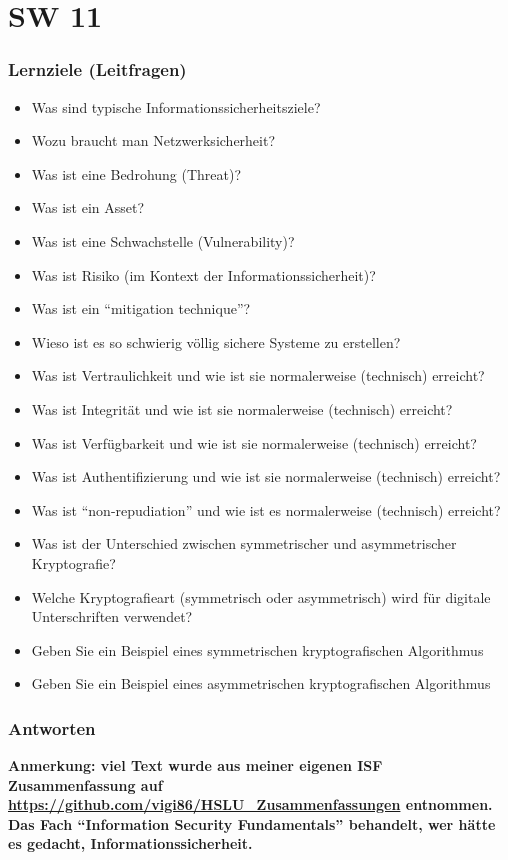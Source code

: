 \part{SW 11}
\section{Lernziele (Leitfragen)}
\begin{itemize}
    \item Was sind typische Informationssicherheitsziele?
    \item Wozu braucht man Netzwerksicherheit?
    \item Was ist eine Bedrohung (Threat)?
    \item Was ist ein Asset?
    \item Was ist eine Schwachstelle (Vulnerability)?
    \item Was ist Risiko (im Kontext der Informationssicherheit)?
    \item Was ist ein "`mitigation technique"'?
    \item Wieso ist es so schwierig völlig sichere Systeme zu erstellen?
    \item Was ist Vertraulichkeit und wie ist sie normalerweise (technisch) erreicht?
    \item Was ist Integrität und wie ist sie normalerweise (technisch) erreicht?
    \item Was ist Verfügbarkeit und wie ist sie normalerweise (technisch) erreicht?
    \item Was ist Authentifizierung und wie ist sie normalerweise (technisch) erreicht?
    \item Was ist "`non-repudiation"' und wie ist es normalerweise (technisch) erreicht?
    \item Was ist der Unterschied zwischen symmetrischer und asymmetrischer Kryptografie?
    \item Welche Kryptografieart (symmetrisch oder asymmetrisch) wird für digitale Unterschriften verwendet?
    \item Geben Sie ein Beispiel eines symmetrischen kryptografischen Algorithmus
    \item Geben Sie ein Beispiel eines asymmetrischen kryptografischen Algorithmus
\end{itemize}

\section{Antworten}
{\color{teal}\textsf{\textbf{Anmerkung: viel Text wurde aus meiner eigenen ISF Zusammenfassung auf \\\url{https://github.com/vigi86/HSLU_Zusammenfassungen} entnommen. Das Fach "`Information Security Fundamentals"' behandelt, wer hätte es gedacht, Informationssicherheit.}}}

